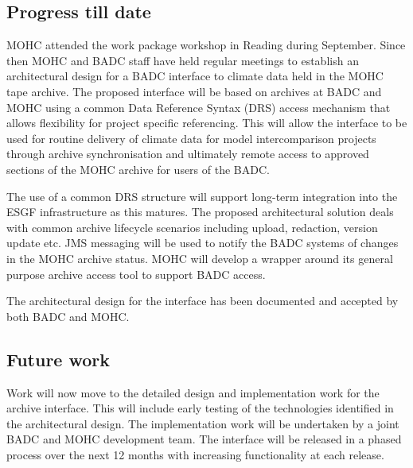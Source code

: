\documentclass[10pt,one-side,a4paper]{memoir}
\begin{document}
\subsection{Progress till date}
MOHC attended the work package workshop in Reading during September. Since then MOHC and BADC staff have held regular
meetings to establish an architectural design for a BADC interface to climate data held in the MOHC tape archive. The
proposed interface will be based on archives at BADC and MOHC using a common Data Reference Syntax (DRS) access
mechanism that allows flexibility for project specific referencing. This will allow the interface to be used for
routine delivery of climate data for model intercomparison projects through archive synchronisation and ultimately
remote access to approved sections of the MOHC archive for users of the BADC.
\par \vspace{2mm}
The use of a common DRS structure will support long-term integration into the ESGF infrastructure as this matures. The
proposed architectural solution deals with common archive lifecycle scenarios including upload, redaction, version
update etc. JMS messaging will be used to notify the BADC systems of changes in the MOHC archive status. MOHC will
develop a wrapper around its general purpose archive access tool to support BADC access.
\par \vspace{2mm}
The architectural design for the interface has been documented and accepted by both BADC and MOHC.
\subsection{Future work}
Work will now move to the detailed design and implementation work for the archive interface. This will include early
testing of the technologies identified in the architectural design. The implementation work will be undertaken by a
joint BADC and MOHC development team. The interface will be released in a phased process over the next 12 months with
increasing functionality at each release.
 
\end{document}
